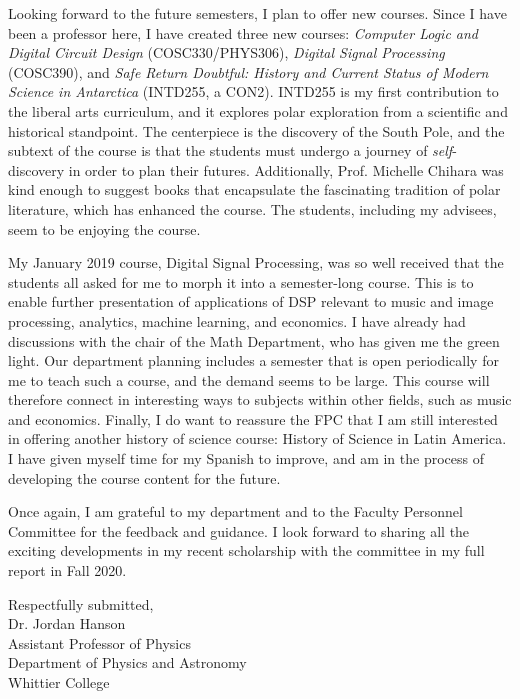 \documentclass[../../main.tex]{subfiles}
\begin{document}
Looking forward to the future semesters, I plan to offer new courses.  Since I have been a professor here, I have created three new courses: \textit{Computer Logic and Digital Circuit Design} (COSC330/PHYS306), \textit{Digital Signal Processing} (COSC390), and \textit{Safe Return Doubtful: History and Current Status of Modern Science in Antarctica} (INTD255, a CON2).  INTD255 is my first contribution to the liberal arts curriculum, and it explores polar exploration from a scientific and historical standpoint.  The centerpiece is the discovery of the South Pole, and the subtext of the course is that the students must undergo a journey of \textit{self}-discovery in order to plan their futures.  Additionally, Prof. Michelle Chihara was kind enough to suggest books that encapsulate the fascinating tradition of polar literature, which has enhanced the course.  The students, including my advisees, seem to be enjoying the course.  \\ \hspace{0.1cm}

My January 2019 course, Digital Signal Processing, was so well received that the students all asked for me to morph it into a semester-long course.  This is to enable further presentation of applications of DSP relevant to music and image processing, analytics, machine learning, and economics.  I have already had discussions with the chair of the Math Department, who has given me the green light.  Our department planning includes a semester that is open periodically for me to teach such a course, and the demand seems to be large.  This course will therefore connect in interesting ways to subjects within other fields, such as music and economics.  Finally, I do want to reassure the FPC that I am still interested in offering another history of science course: History of Science in Latin America.  I have given myself time for my Spanish to improve, and am in the process of developing the course content for the future. \\ \hspace{0.1cm}

Once again, I am grateful to my department and to the Faculty Personnel Committee for the feedback and guidance.  I look forward to sharing all the exciting developments in my recent scholarship with the committee in my full report in Fall 2020. \\ \hspace{0.1cm}

Respectfully submitted, \\
Dr. Jordan Hanson\\
Assistant Professor of Physics\\
Department of Physics and Astronomy\\
Whittier College
\end{document}
